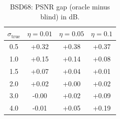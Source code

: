 \begin{table}[h]
\centering
\begin{tabular}{cccc}
\toprule
$\sigma_{\text{true}}$ & $\eta = 0.01$ & $\eta = 0.05$ & $\eta = 0.1$ \\
\midrule
0.5 & +0.32 & +0.38 & +0.37 \\
1.0 & +0.15 & +0.14 & +0.08 \\
1.5 & +0.07 & +0.04 & +0.01 \\
2.0 & +0.02 & +0.00 & +0.02 \\
3.0 & -0.00 & +0.02 & +0.09 \\
4.0 & -0.01 & +0.05 & +0.19 \\
\bottomrule
\end{tabular}
\caption{BSD68: PSNR gap (oracle minus blind) in dB.}
\label{tab:psnr_gap_bsd68}
\end{table}
